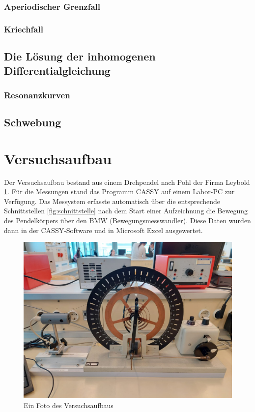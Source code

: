 \documentclass{article}
\begin{document}
\subsubsection{Aperiodischer Grenzfall}
\subsubsection{Kriechfall}
\subsection{Die Lösung der inhomogenen Differentialgleichung}
\subsubsection{Resonanzkurven}
\subsection{Schwebung}
\clearpage

\section{Versuchsaufbau}
Der Versuchsaufbau bestand aus einem Drehpendel nach Pohl der Firma Leybold \ref{fig:versuchsaufbau}.
Für die Messungen stand das Programm CASSY auf einem Labor-PC zur Verfügung.
Das Messystem erfasste automatisch über die entsprechende Schnittstellen \ref{fig:schnittstelle}
nach dem Start einer Aufzeichnung die Bewegung des Pendelkörpers
über den BMW (Bewegungsmesswandler). Diese Daten wurden dann in der CASSY-Software
und in Microsoft Excel ausgewertet.

\begin{figure}
    \includegraphics[width=\linewidth]{bilder/drehpendel.jpg}
    \caption{Ein Foto des Versuchsaufbaus}
    \label{fig:versuchsaufbau}
\end{figure}
\end{document}
